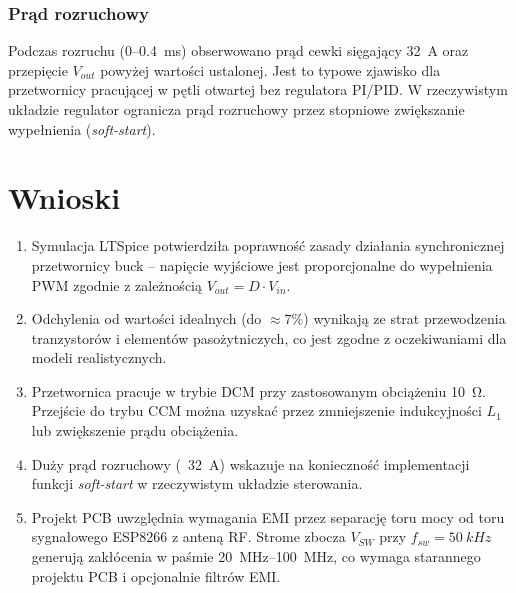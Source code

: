 \documentclass[12pt,a4paper]{article}
\begin{document}
\subsubsection{Prąd rozruchowy}

Podczas rozruchu (0--\SI{0,4}{ms}) obserwowano prąd cewki sięgający \SI{32}{A}
oraz przepięcie $V_{out}$ powyżej wartości ustalonej. Jest to typowe zjawisko dla
przetwornicy pracującej w pętli otwartej bez regulatora PI/PID.
W rzeczywistym układzie regulator ogranicza prąd rozruchowy przez stopniowe
zwiększanie wypełnienia (\textit{soft-start}).

\section{Wnioski}

\begin{enumerate}
    \item Symulacja LTSpice potwierdziła poprawność zasady działania synchronicznej
          przetwornicy buck -- napięcie wyjściowe jest proporcjonalne do wypełnienia PWM
          zgodnie z zależnością $V_{out} = D \cdot V_{in}$.

    \item Odchylenia od wartości idealnych (do $\approx 7\%$) wynikają ze strat
          przewodzenia tranzystorów i elementów pasożytniczych, co jest zgodne
          z oczekiwaniami dla modeli realistycznych.

    \item Przetwornica pracuje w trybie DCM przy zastosowanym obciążeniu \SI{10}{\ohm}.
          Przejście do trybu CCM można uzyskać przez zmniejszenie indukcyjności $L_1$
          lub zwiększenie prądu obciążenia.

    \item Duży prąd rozruchowy (~\SI{32}{A}) wskazuje na konieczność implementacji
          funkcji \textit{soft-start} w rzeczywistym układzie sterowania.

    \item Projekt PCB uwzględnia wymagania EMI przez separację toru mocy od toru
          sygnałowego ESP8266 z anteną RF. Strome zbocza $V_{SW}$ przy
          $f_{sw} = \SI{50}{kHz}$ generują zakłócenia w paśmie \SIrange{20}{100}{MHz},
          co wymaga starannego projektu PCB i opcjonalnie filtrów EMI.
\end{enumerate}
\end{document}
